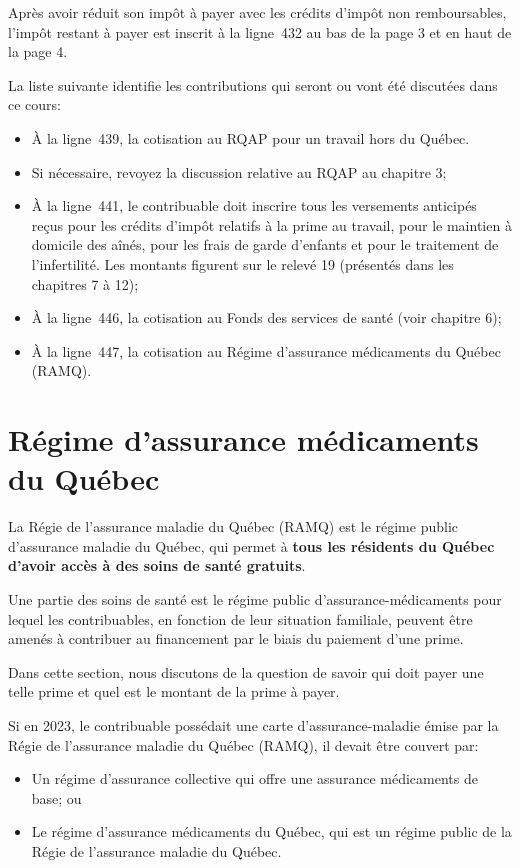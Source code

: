 Après avoir réduit son impôt à payer avec les crédits d'impôt non remboursables, l'impôt \textbf{}restant à payer est inscrit à la ligne~432 au bas de la page 3 et en haut de la page 4. 

La liste suivante identifie les contributions qui seront ou vont été discutées dans ce cours:
\begin{itemize}
	\item À la ligne~439, la cotisation au RQAP pour un travail hors du Québec.
	\item Si nécessaire, revoyez la discussion relative au RQAP au chapitre 3;
	\item À la ligne~441, le contribuable doit inscrire tous les versements anticipés reçus pour les crédits d'impôt relatifs à la prime au travail, pour le maintien à domicile des aînés, pour les frais de garde d'enfants et pour le traitement de l'infertilité. Les montants figurent sur le relevé 19 (présentés dans les chapitres 7 à 12);
	\item À la ligne~446, la cotisation au Fonds des services de santé (voir chapitre 6);
	\item À la ligne~447, la cotisation au Régime d'assurance médicaments du Québec (RAMQ).
\end{itemize}



\section{Régime d'assurance médicaments du Québec}
\begin{intro}
	La Régie de l'assurance maladie du Québec (RAMQ) est le régime public d'assurance maladie du Québec, qui permet à \textbf{tous les résidents du Québec d'avoir accès à des soins de santé gratuits}.
	
	Une partie des soins de santé est le régime public d'assurance-médicaments pour lequel les contribuables, en fonction de leur situation familiale, peuvent être amenés à contribuer au financement par le biais du paiement d'une prime.
	
	Dans cette section, nous discutons de la question de savoir qui doit payer une telle prime et quel est le montant de la prime à payer.
\end{intro}
Si en 2023, le contribuable possédait une carte d'assurance-maladie émise par la Régie de l'assurance maladie du Québec (RAMQ), il devait être couvert par:
\begin{itemize}
	\item Un régime d'assurance collective qui offre une assurance médicaments de base; ou
	\item Le régime d'assurance médicaments du Québec, qui est un \og régime public \fg{} de la Régie de l'assurance maladie du Québec.
\end{itemize}

